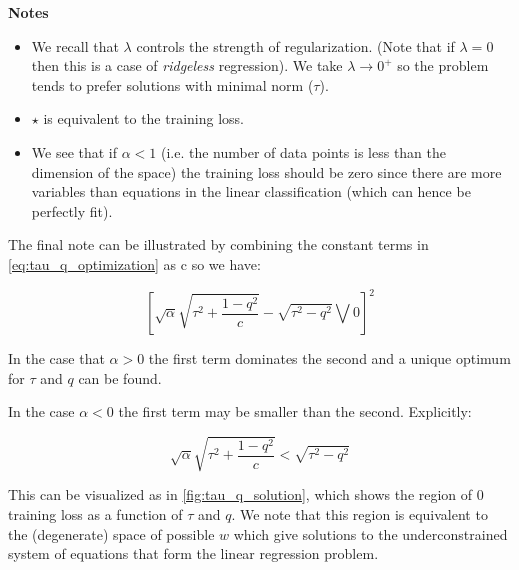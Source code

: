 \textbf{Notes}
\begin{itemize}
	\item We recall that $\lambda$ controls the strength of regularization. 
(Note that if $\lambda = 0$ then this is a case of \textit{ridgeless} regression).
We take $\lambda \rightarrow 0^+$ so the problem tends to prefer solutions with minimal norm ($\tau$).
\item $\star$ is equivalent to the training loss. 
\item We see that if $\alpha <1$ (i.e. the number of data points is less than the dimension of the space) the training loss should be zero since there are more variables than equations in the linear classification (which can hence be perfectly fit). 
\end{itemize}

The final note can be illustrated by combining the constant terms in \ref{eq:tau_q_optimization} as c so we have:

\begin{equation*}
	\left[ \sqrt{\alpha}\sqrt{\tau^2 + \frac{1-q^2}{c}} - \sqrt{\tau^2 - q^2} \bigvee 0\right] ^2
\end{equation*}

In the case that $\alpha >0$ the first term dominates the second and a unique optimum for $\tau$ and $q$ can be found. 

In the case $\alpha <0$  the first term may be smaller than the second. Explicitly:

\begin{equation}\label{eq:alpha_less_than_0_inequality}
	\sqrt{\alpha}\sqrt{\tau^2 + \frac{1-q^2}{c}} < \sqrt{\tau^2 - q^2}
\end{equation}

This can be visualized as in \ref{fig:tau_q_solution}, which shows the region of 0 training loss as a function of $\tau$ and $q$. 
We note that this region is equivalent to the (degenerate) space of possible $w$ which give solutions to the underconstrained system of equations that form the linear regression problem.

